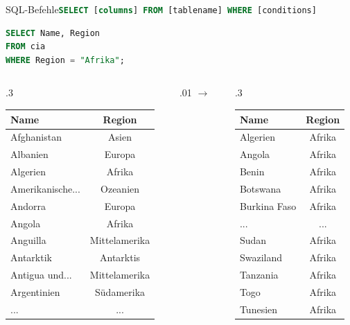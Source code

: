\begin{frame}[fragile]{SQL-Befehle}{\lstinline[language=SQL]|SELECT [columns] FROM [tablename] WHERE [conditions]|}
\begin{lstlisting}[language=SQL, basicstyle=\ttfamily\scriptsize]
SELECT Name, Region
FROM cia
WHERE Region = "Afrika";
\end{lstlisting}

\begin{columns}[c]
\centering
\begin{column}{.3\textwidth}
\begin{table}
  \centering
  \tiny
  \begin{tabular}{lc}
    \toprule
    \textbf{Name} & \textbf{Region} \\
    \midrule
    Afghanistan & Asien \\
    Albanien & Europa \\
    \rowcolor[gray]{.8} Algerien & Afrika \\
    Amerikanische... & Ozeanien \\
    Andorra & Europa \\
    \rowcolor[gray]{.8} Angola & Afrika \\
    Anguilla & Mittelamerika \\
    Antarktik & Antarktis \\
    Antigua und... & Mittelamerika \\
    Argentinien & Südamerika \\
    \midrule
    ... & ... \\
    \bottomrule
  \end{tabular}
\end{table}
\end{column}
\begin{column}{.01\textwidth}
$\rightarrow$
\end{column}
\begin{column}{.3\textwidth}
\begin{table}
  \centering
  \tiny
  \begin{tabular}{lc}
    \toprule
    \textbf{Name} & \textbf{Region} \\
    \midrule
    Algerien & Afrika \\
    Angola & Afrika \\
    Benin & Afrika \\
    Botswana & Afrika \\
    Burkina Faso & Afrika \\
    \midrule
    ... & ... \\
    \midrule
    Sudan & Afrika \\
    Swaziland & Afrika \\
    Tanzania & Afrika \\
    Togo & Afrika \\
    Tunesien & Afrika \\
    \bottomrule
  \end{tabular}
\end{table}
\end{column}
\end{columns}
\end{frame}


